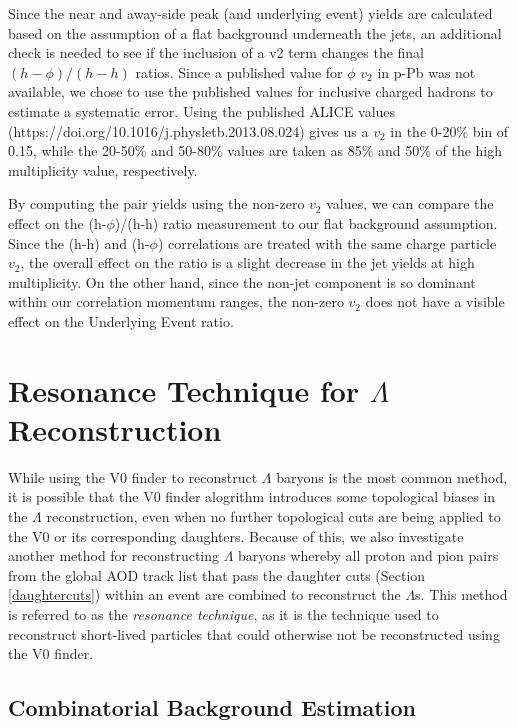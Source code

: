\documentclass[ALICE,manyauthors]{ALICE_analysis_notes}
\begin{document}
\begin{itemize}
Since the near and away-side peak (and underlying event) yields are calculated based on the assumption of a flat background underneath the jets, an additional check is needed to see if the inclusion of a v2 term changes the final $(h-\phi)/(h-h)$ ratios.  Since a published value for $\phi$ $v_2$ in p-Pb was not available, we chose to use the published values for inclusive charged hadrons to estimate a systematic error.  Using the published ALICE values (https://doi.org/10.1016/j.physletb.2013.08.024) gives us a $v_2$ in the 0-20\% bin of 0.15, while the 20-50\% and 50-80\% values are taken as 85\% and 50\% of the high multiplicity value, respectively.

By computing the pair yields using the non-zero $v_2$ values, we can compare the effect on the (h-$\phi$)/(h-h) ratio measurement to our flat background assumption.  Since the (h-h) and (h-$\phi$) correlations are treated with the same charge particle $v_2$, the overall effect on the ratio is a slight decrease in the jet yields at high multiplicity.  On the other hand, since the non-jet component is so dominant within our correlation momentum ranges, the non-zero $v_2$ does not have a visible effect on the Underlying Event ratio.


\clearpage
\appendix

\section{Resonance Technique for $\Lambda$ Reconstruction}
\label{resonance_technique}

While using the V0 finder to reconstruct $\Lambda$ baryons is the most common method, it is possible that the V0 finder alogrithm introduces some topological biases in the $\Lambda$ reconstruction, even when no further topological cuts are being applied to the V0 or its corresponding daughters. Because of this, we also investigate another method for reconstructing $\Lambda$ baryons whereby all proton and pion pairs from the global AOD track list that pass the daughter cuts (Section \ref{daughtercuts}) within an event are combined to reconstruct the $\Lambda$s. This method is referred to as the \textit{resonance technique}, as it is the technique used to reconstruct short-lived particles that could otherwise not be reconstructed using the V0 finder.

\subsection{Combinatorial Background Estimation}
\label{combinatorial_background}


\end{itemize}
\end{document}
